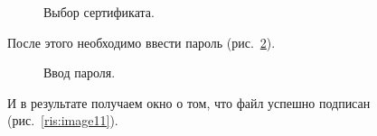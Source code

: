\documentclass[10pt,a4paper,titlepage]{article}
\begin{document}
\begin{figure}[!h]	
\caption{Выбор сертификата.}
\label{ris:image9}
\end{figure}

После этого необходимо ввести пароль \mbox{(рис. \ref{ris:image10})}.

\begin{figure}[!h]	
\caption{Ввод пароля.}
\label{ris:image10}
\end{figure}

И в результате получаем окно о том, что файл успешно подписан \mbox{(рис. \ref{ris:image11})}.
\end{document}
